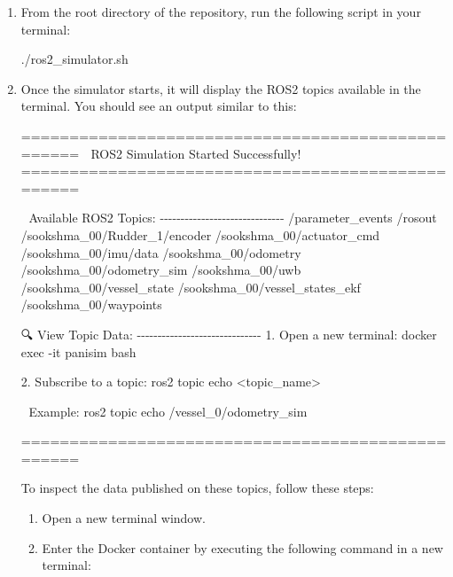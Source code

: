 \documentclass[
  letterpaper,
  DIV=11,
  numbers=noendperiod]{scrreprt}
\newenvironment{Shaded}{\begin{snugshade}}{\end{snugshade}}
\newcommand{\ExtensionTok}[1]{\textcolor[rgb]{0.00,0.23,0.31}{#1}}
\newcommand{\NormalTok}[1]{\textcolor[rgb]{0.00,0.23,0.31}{#1}}
\begin{document}
\begin{enumerate}
\def\labelenumi{\arabic{enumi}.}
\item
  From the root directory of the repository, run the following script in
  your terminal:

\begin{Shaded}
\begin{Highlighting}[]
\ExtensionTok{./ros2\_simulator.sh}
\end{Highlighting}
\end{Shaded}
\item
  Once the simulator starts, it will display the ROS2 topics available
  in the terminal. You should see an output similar to this:

\begin{Shaded}
\begin{Highlighting}[]
\NormalTok{   ==================================================}
\NormalTok{   🚀 ROS2 Simulation Started Successfully!}
\NormalTok{   ==================================================}

\NormalTok{📡 Available ROS2 Topics:}
\NormalTok{{-}{-}{-}{-}{-}{-}{-}{-}{-}{-}{-}{-}{-}{-}{-}{-}{-}{-}{-}{-}{-}{-}{-}{-}{-}{-}{-}{-}{-}{-}}
\NormalTok{/parameter\_events}
\NormalTok{/rosout}
\NormalTok{/sookshma\_00/Rudder\_1/encoder}
\NormalTok{/sookshma\_00/actuator\_cmd}
\NormalTok{/sookshma\_00/imu/data}
\NormalTok{/sookshma\_00/odometry}
\NormalTok{/sookshma\_00/odometry\_sim}
\NormalTok{/sookshma\_00/uwb}
\NormalTok{/sookshma\_00/vessel\_state}
\NormalTok{/sookshma\_00/vessel\_states\_ekf}
\NormalTok{/sookshma\_00/waypoints}

\NormalTok{🔍 View Topic Data:}
\NormalTok{{-}{-}{-}{-}{-}{-}{-}{-}{-}{-}{-}{-}{-}{-}{-}{-}{-}{-}{-}{-}{-}{-}{-}{-}{-}{-}{-}{-}{-}{-}}
\NormalTok{1. Open a new terminal:}
\NormalTok{    docker exec {-}it panisim bash}

\NormalTok{2. Subscribe to a topic:}
\NormalTok{    ros2 topic echo \textless{}topic\_name\textgreater{}}

\NormalTok{📝 Example:}
\NormalTok{    ros2 topic echo /vessel\_0/odometry\_sim}

\NormalTok{==================================================}
\end{Highlighting}
\end{Shaded}

  To inspect the data published on these topics, follow these steps:

  \begin{enumerate}
  \def\labelenumii{\alph{enumii}.}
  \item
    Open a new terminal window.
  \item
    Enter the Docker container by executing the following command in a
    new terminal:
  \end{enumerate}


\end{enumerate}
\end{document}
